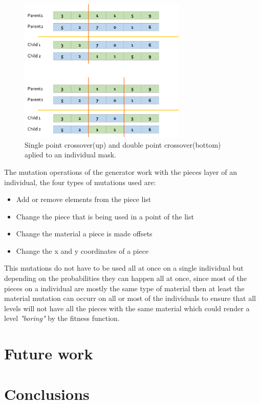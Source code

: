 \documentclass[conference]{IEEEtran}
\begin{document}
\begin{figure}[htbp]
    \centerline{\includegraphics[width=80mm]{Images/crossover.png}}
    \caption{Single point crossover(up) and double point crossover(bottom) aplied to an individual mask.}
    \label{crossover}
\end{figure}

The mutation operations of the generator work with the pieces layer of an individual, the four types of mutations used are:

\begin{itemize}
    \item Add or remove elements from the piece list
    \item Change the piece that is being used in a point of the list
    \item Change the material a piece is made offsets
    \item Change the x and y coordinates of a piece
\end{itemize}

This mutations do not have to be used all at once on a single individual but depending on the probabilities they can happen all at once, since most of the pieces on a individual are mostly the same type of material then at least the material mutation can occurr on all or most of the individuals to ensure that all levels will not have all the pieces with the same material which could render a level \textit{"boring"} by the fitness function.



\section{Future work}


\section{Conclusions}
\end{document}
